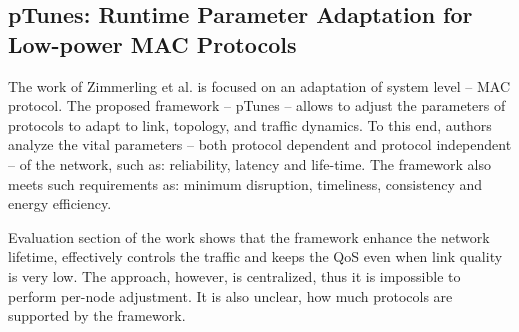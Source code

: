\subsection{pTunes: Runtime Parameter Adaptation for Low-power MAC Protocols}

The work of Zimmerling et al. is focused on an adaptation of system level -- MAC
protocol. The proposed framework -- pTunes -- allows to adjust the parameters
of protocols to adapt to link, topology, and traffic dynamics. To this end, authors
analyze the vital parameters -- both protocol dependent and protocol independent
-- of the network, such as: reliability, latency and life-time. The framework also
meets such requirements as: minimum disruption, timeliness, consistency and
energy efficiency.

Evaluation section of the work shows that the framework enhance the network
lifetime, effectively controls the traffic and keeps the QoS even when link
quality is very low. The approach, however, is centralized, thus it is
impossible to perform per-node adjustment. It is also unclear, how much
protocols are supported by the framework.